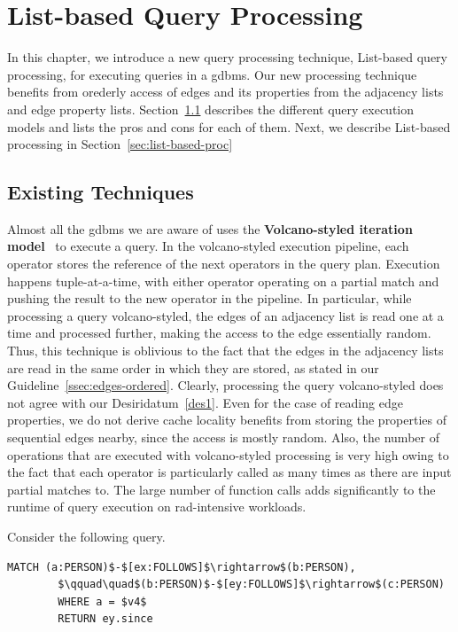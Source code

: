 \chapter{List-based Query Processing}
\label{list-based-processing}

In this chapter, we introduce a new query processing technique, List-based query processing, for executing queries in a \gls{gdbms}. Our new processing technique benefits from orederly access of edges and its properties from the adjacency lists and edge property lists. Section~\ref{sec:existing-techniques} describes the different query execution models and lists the pros and cons for each of them. Next, we describe List-based processing in Section~\ref{sec:list-based-proc}

\section{Existing Techniques}
\label{sec:existing-techniques}
Almost all the \gls{gdbms} we are aware of uses the \textbf{Volcano-styled iteration model}~\cite{volcano} to execute a query. In the volcano-styled execution pipeline, each operator stores the reference of the next operators in the query plan. Execution happens tuple-at-a-time, with either operator operating on a partial match and pushing the result to the new operator in the pipeline. In particular, while processing a query volcano-styled, the edges of an adjacency list is read one at a time and processed further, making the access to the edge essentially random. Thus, this technique is oblivious to the fact that the edges in the adjacency lists are read in the same order in which they are stored, as stated in our Guideline~\ref{ssec:edges-ordered}. Clearly, processing the query volcano-styled does not agree with our Desiridatum~\ref{des1}. Even for the case of reading edge properties, we do not derive cache locality benefits from storing the properties of sequential edges nearby, since the access is mostly random. Also, the number of operations that are executed with volcano-styled processing is very high owing to the fact that each operator is particularly called as many times as there are input partial matches to. The large number of function calls adds significantly to the runtime of query execution on rad-intensive workloads.

\begin{example}
	\vspace{5pt}
	\label{ex:proc-example}
	Consider the following query. 
	{\em 
		\begin{lstlisting}[numbers=none,  showstringspaces=false,belowskip=0pt ]
		MATCH (a:PERSON)$-$[ex:FOLLOWS]$\rightarrow$(b:PERSON),
		$\qquad\quad$(b:PERSON)$-$[ey:FOLLOWS]$\rightarrow$(c:PERSON)
		WHERE a = $v4$
		RETURN ey.since\end{lstlisting}
	}
\end{example}
\vspace{-5pt}

